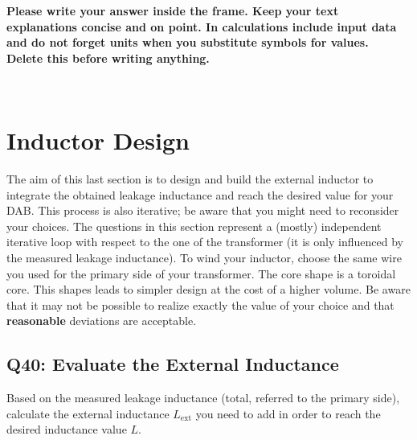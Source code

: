 \documentclass{PELsmallreport}
\begin{document}
\begin{framed}
	\vspace{2em}
	\textbf{Please write your answer inside the frame. Keep your text explanations concise and on point. In calculations include input data and do not forget units when you substitute symbols for values. \\ Delete this before writing anything.}
	\vspace{2em}
\end{framed}


 \quad {} \\  \quad {} \quad {} \hfill{}









\newpage
\section{Inductor Design}

The aim of this last section is to design and build the external inductor to integrate the obtained leakage inductance and reach the desired value for your DAB. 
This process is also iterative; be aware that you might need to reconsider your choices. 
The questions in this section represent a (mostly) independent iterative loop with respect to the one of the transformer (it is only influenced by the measured leakage inductance).  
To wind your inductor, choose the same wire you used for the primary side of your transformer. 
The core shape is a toroidal core. 
This shapes leads to simpler design at the cost of a higher volume.   
Be aware that it may not be possible to realize exactly the value of your choice and that \textbf{reasonable} deviations are acceptable.






\subsection{Q40: Evaluate the External Inductance} 
Based on the measured leakage inductance (total, referred to the primary side), calculate the external inductance $L_\mathrm{ext}$ you need to add in order to reach the desired inductance value $L$. 
\\
\end{document}
